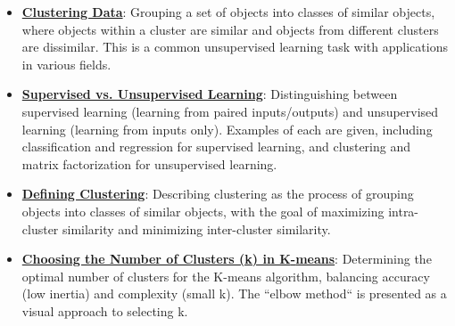 \documentclass{article}%
\begin{document}
\begin{itemize}[leftmargin=*]%
\item \href{https://purdue.brightspace.com/d2l/common/assets/pdfjs-d2l-dist/1.0.14-legacy/web/viewer.html?file=\%2Fcontent\%2Fenforced\%2F1095467-wl.202510.CS.24300.001\%2F12L2-distance-clusters.pdf\%3Fou\%3D1095467\&lang=en-us\&container=d2l-fileviewer-rendered-pdf\&fullscreen=d2l-fileviewer-rendered-pdf-dialog\&height=667#page=4}{\textbf{Clustering Data}}: Grouping a set of objects into classes of similar objects, where objects within a cluster are similar and objects from different clusters are dissimilar. This is a common unsupervised learning task with applications in various fields.%
\item \href{https://purdue.brightspace.com/d2l/common/assets/pdfjs-d2l-dist/1.0.14-legacy/web/viewer.html?file=\%2Fcontent\%2Fenforced\%2F1095467-wl.202510.CS.24300.001\%2F12L2-distance-clusters.pdf\%3Fou\%3D1095467\&lang=en-us\&container=d2l-fileviewer-rendered-pdf\&fullscreen=d2l-fileviewer-rendered-pdf-dialog\&height=667#page=3}{\textbf{Supervised vs. Unsupervised Learning}}: Distinguishing between supervised learning (learning from paired inputs/outputs) and unsupervised learning (learning from inputs only). Examples of each are given, including classification and regression for supervised learning, and clustering and matrix factorization for unsupervised learning.%
\item \href{https://purdue.brightspace.com/d2l/common/assets/pdfjs-d2l-dist/1.0.14-legacy/web/viewer.html?file=\%2Fcontent\%2Fenforced\%2F1095467-wl.202510.CS.24300.001\%2F12L2-distance-clusters.pdf\%3Fou\%3D1095467\&lang=en-us\&container=d2l-fileviewer-rendered-pdf\&fullscreen=d2l-fileviewer-rendered-pdf-dialog\&height=667#page=4}{\textbf{Defining Clustering}}: Describing clustering as the process of grouping objects into classes of similar objects, with the goal of maximizing intra-cluster similarity and minimizing inter-cluster similarity.%
\item \href{https://purdue.brightspace.com/d2l/common/assets/pdfjs-d2l-dist/1.0.14-legacy/web/viewer.html?file=\%2Fcontent\%2Fenforced\%2F1095467-wl.202510.CS.24300.001\%2F12L2-distance-clusters.pdf\%3Fou\%3D1095467\&lang=en-us\&container=d2l-fileviewer-rendered-pdf\&fullscreen=d2l-fileviewer-rendered-pdf-dialog\&height=667#page=33}{\textbf{Choosing the Number of Clusters (k) in K{-}means}}: Determining the optimal number of clusters for the K-means algorithm, balancing accuracy (low inertia) and complexity (small k). The ``elbow method`` is presented as a visual approach to selecting k.%

\end{itemize}
\end{document}
